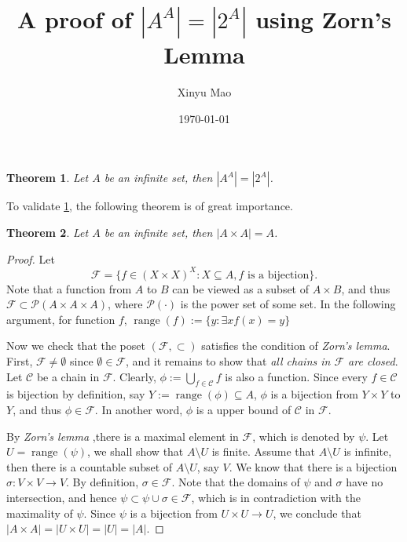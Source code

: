 \documentclass[12pt]{article}
\title{A proof of $|A^A| = |2^A| $ using Zorn's Lemma}
\author{Xinyu Mao}
\date{\today}
\theoremstyle{mythm}
\newtheorem{theorem}{Theorem}
\newcommand\cc{\mathcal{C}}
\newcommand\pp{\mathcal{P}}
\newcommand\ff{\mathcal{F}}
\DeclareMathOperator{\range}{range}
\begin{document}
\maketitle

\begin{tcolorbox}
\begin{theorem} \label{main}
    Let $A$ be an infinite set, then $|A^A| = |2^A|$.
\end{theorem}
\end{tcolorbox}
To validate \cref{main}, the following theorem is of great importance.

\begin{tcolorbox}
\begin{theorem} \label{helper}
    Let $A$ be an infinite set, then $|A \times A| = A$. 
\end{theorem}  
\end{tcolorbox}
\begin{proof}[Proof]   
    Let 
    $$
    \ff = \{f \in (X \times X)^X : X \subseteq A, f \text{ is a bijection}\}.
    $$
    Note that a function from $A$ to $B$ can be viewed as 
    a subset of $A \times B$, and thus $\ff \subset \pp(A \times A \times A)$,
    where $\pp(\cdot)$ is the power set of some set. 
    In the following argument, for function $f$, $\range(f) := \{y:\exists x f(x) = y\}$
    
    Now we check that the poset $(\ff, \subset)$ satisfies
    the condition of \textit{Zorn's lemma}. 
    First, $\ff \neq \emptyset$ since $\emptyset \in \ff$,
    and it remains to show that \textit{all chains in $\ff$ are closed}.
    Let $\cc$ be a chain in $\ff$. 
    Clearly, $\phi := \bigcup_{f \in \cc} f$ is also a
    function. Since every $f \in \cc$ is bijection by definition, 
    say $Y := \range(\phi) \subseteq A$, $\phi$ is a bijection from $Y \times Y$ to $Y$,
    and thus $\phi \in \ff$.
    In another word, $\phi$ is a upper bound of $\cc$ in $\ff$. 

    By \textit{Zorn's lemma} ,there is a maximal element in $\ff$,
    which is denoted by $\psi$. Let $U = \range(\psi)$, we shall
    show that $A\setminus U$ is finite. Assume that $A\setminus U$
    is infinite, then there is a countable subset of $A\setminus U$,
    say $V$. We know that there is a bijection $\sigma : V \times V \to V$.
    By definition, $\sigma \in \ff$. 
    Note that the domains of $\psi$ and $\sigma$ have no intersection, 
    and hence $\psi \subset \psi \cup \sigma \in \ff$, 
    which is in contradiction with the maximality of $\psi$.
    Since $\psi$ is a bijection from $U \times U \to U$,
    we conclude that $|A \times A| = |U \times U| = |U| = |A|$.
\end{proof}     
\end{document}
